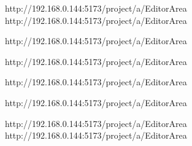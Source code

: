 http://192.168.0.144:5173/project/a/EditorArea
http://192.168.0.144:5173/project/a/EditorArea

http://192.168.0.144:5173/project/a/EditorArea

http://192.168.0.144:5173/project/a/EditorArea

http://192.168.0.144:5173/project/a/EditorArea

http://192.168.0.144:5173/project/a/EditorArea

http://192.168.0.144:5173/project/a/EditorArea
http://192.168.0.144:5173/project/a/EditorArea

